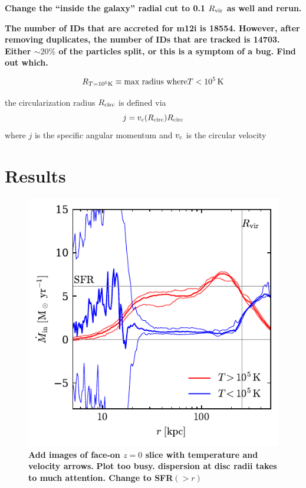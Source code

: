 \documentclass[fleqn,usenatbib]{mnras}
\newcommand{\Rcool}{R_{T=10^5 {\rm K}}}
\newcommand{\Rcirc}{R_{\rm circ}} %
\begin{document}
\textbf{Change the ``inside the galaxy'' radial cut to 0.1 $R_{\rm vir}$ as well and rerun.}

\textbf{The number of IDs that are accreted for m12i is 18554.
However, after removing duplicates, the number of IDs that are tracked is 14703.
Either $\sim20\%$ of the particles split, or this is a symptom of a bug.
Find out which.}


\begin{equation}
    \Rcool \equiv \text{max radius where} T<10^5\,{\rm K}
\end{equation}


the circularization radius $\Rcirc$ is defined via
\begin{equation}
    j = v_{\rm c}(\Rcirc)\Rcirc
\end{equation}
where $j$ is the specific angular momentum and $v_{\rm c}$ is the circular velocity



\section{Results}


\begin{figure}
    \centering
    \includegraphics{Mdot_m12i.pdf}
    \caption{
    \textbf{Add images of face-on $z=0$ slice with temperature and velocity arrows.}
    \textbf{Plot too busy. dispersion at disc radii takes to much attention. Change to SFR$(>r)$}
    }
    \label{f:Mdot}
\end{figure}
\end{document}
